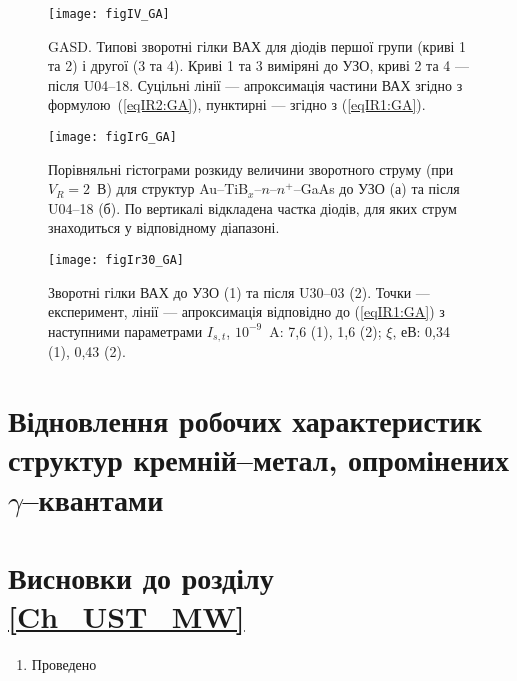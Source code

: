\documentclass[a4paper,14pt,oneside,openany]{memoir}
\begin{document}
\begin{figure}
\center
\texttt{[image: figIV\_GA]}%
\caption{\label{figIV_GA}
GASD.
Типові зворотні гілки ВАХ для діодів першої групи (криві 1 та 2) і другої (3 та 4).
Криві 1 та 3 виміряні до УЗО, криві 2 та 4 --- після U04--18.
Суцільні лінії --- апроксимація частини ВАХ згідно з формулою~(\ref{eqIR2:GA}),
пунктирні  --- згідно з (\ref{eqIR1:GA}).
}
\end{figure}


\begin{figure}
\center
\texttt{[image: figIrG\_GA]}%
\caption{\label{figIrG_GA}
Порівняльні гістограми розкиду величини зворотного струму (при $V_R=2$~В)
для структур Au--TiB$_x$--$n$--$n^+$--GaAs до УЗО (а) та після U04--18 (б).
По вертикалі відкладена частка діодів, для яких струм знаходиться у відповідному діапазоні.
}
\end{figure}


\begin{figure}
\center
\texttt{[image: figIr30\_GA]}%
\caption{\label{figIr30_GA}
Зворотні гілки ВАХ до УЗО (1) та після U30--03 (2).
Точки --- експеримент,
лінії --- апроксимація відповідно до (\ref{eqIR1:GA}) з наступними параметрами
$I_{s,t}$, $10^{-9}$~A: 7,6 (1), 1,6 (2);
$\xi$, еВ: 0,34 (1), 0,43 (2).
}
\end{figure}


\section{Відновлення робочих характеристик структур кремній--метал, опромінених $\gamma$--квантами}



\section*{Висновки до розділу \ref{Ch_UST_MW}}
  \begin{enumerate}
     \item Проведено
  \end{enumerate}	
\end{document}
